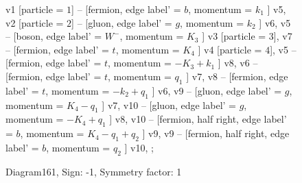 \documentclass{revtex4}
\begin{document}
\begin{figure}[!htb]
\begin{center}
{    %
v1 [particle = \(1\)] -- [fermion, edge label' = \(b\), momentum = \(k_{1}\) ] v5, 
v2 [particle = \(2\)] -- [gluon, edge label' = \(g\), momentum = \(k_{2}\) ] v6, 
v5 -- [boson, edge label' = \(W^{-}\), momentum = \(K_{3}\) ] v3 [particle = \(3\)], 
v7 -- [fermion, edge label' = \(t\), momentum = \(K_{4}\) ] v4 [particle = \(4\)], 
v5 -- [fermion, edge label' = \(t\), momentum = \(-K_{3} + k_{1}\) ] v8, 
v6 -- [fermion, edge label' = \(t\), momentum = \(q_{1}\) ] v7, 
v8 -- [fermion, edge label' = \(t\), momentum = \(-k_{2} + q_{1}\) ] v6, 
v9 -- [gluon, edge label' = \(g\), momentum = \(K_{4} - q_{1}\) ] v7, 
v10 -- [gluon, edge label' = \(g\), momentum = \(-K_{4} + q_{1}\) ] v8, 
v10 -- [fermion, half right, edge label' = \(b\), momentum = \(K_{4} - q_{1} + q_{2}\) ] v9, 
v9 -- [fermion, half right, edge label' = \(b\), momentum = \(q_{2}\) ] v10, 
};
\end{center}
\caption{Diagram161, Sign: -1, Symmetry factor: 1}
\end{figure}
\newpage
\end{document}
